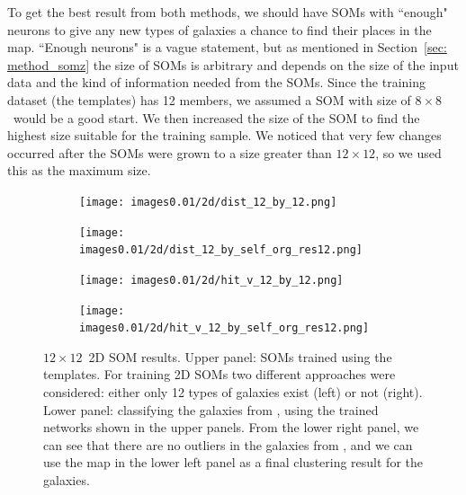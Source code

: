         To get the best result from both methods, we should have SOMs with ``enough"  neurons to give any new types of galaxies a chance to find their places in the map.
        ``Enough neurons" is a vague statement, but as mentioned in Section~\ref{sec: method_somz} the size of SOMs is arbitrary and depends on the size of the input data and the kind of information needed from the SOMs.
        Since the training dataset (the  templates) has 12 members, we assumed a SOM with size of $8\times8$~would be a good start.
        We then increased the size of the SOM to find the highest size suitable for the training sample.
        We noticed that very few changes occurred after the SOMs were grown to a size greater than $12\times12$, so we used this as the maximum size.
    
        \begin{figure}
            \begin{subfigure}[b]{0.45\textwidth}
                \centering
                \texttt{[image: images0.01/2d/dist\_12\_by\_12.png]}
            \end{subfigure}
            \hfill
            \begin{subfigure}[b]{0.45\textwidth}
                \centering
                \texttt{[image: images0.01/2d/dist\_12\_by\_self\_org\_res12.png]}
            \end{subfigure}
            \hfill
            \begin{subfigure}[b]{0.45\textwidth}
                \texttt{[image: images0.01/2d/hit\_v\_12\_by\_12.png]}
            \end{subfigure}
            \hfill
            \begin{subfigure}[b]{0.45\textwidth}
                \texttt{[image: images0.01/2d/hit\_v\_12\_by\_self\_org\_res12.png]}
            \end{subfigure}
            \caption[$12\times12$ two-dimensional self-organizing map results]{$12\times12$~2D SOM results. Upper panel: SOMs trained using the \citet{Kinney96} templates. For training 2D SOMs two different approaches were considered: either only 12 types of galaxies exist (left) or not (right). Lower panel: classifying the galaxies from \citet{Hossein12}, using the trained networks shown in the upper panels. From the lower right panel, we can see that there are no outliers in the galaxies from , and we can use the map in the lower left panel as a final clustering result for the  galaxies.}
            \label{fig: 12by12}
        \end{figure}
    
